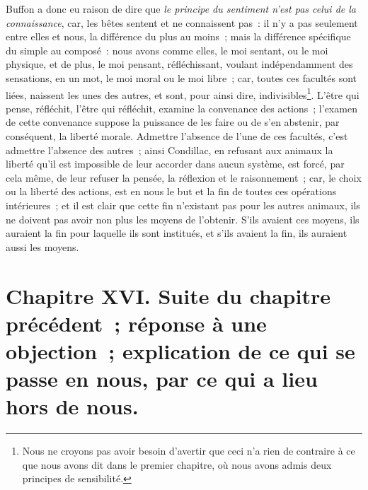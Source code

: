 \documentclass[french,twoside]{book} %
\newcommand\chapteropen{} %
\newcommand\chapterclose{} %
\begin{document}
Buffon a donc eu raison de dire que {\itshape le principe du sentiment n’est pas celui de la connaissance}, car, les bêtes sentent et ne connaissent pas : il n’y a pas seulement entre elles et nous, la différence du plus au moins ; mais la différence spécifique du simple au composé : nous avons comme elles, le moi sentant, ou le moi physique, et de plus, le moi pensant, réfléchissant, voulant indépendamment des sensations, en un mot, le moi moral ou le moi libre ; car, toutes ces facultés sont liées, naissent les unes des autres, et sont, pour ainsi dire, indivisibles\footnote{Nous ne croyons pas avoir besoin d’avertir que ceci n’a rien de contraire à ce que nous avons dit dans le premier chapitre, où nous avons admis deux principes de sensibilité.}. L’être qui pense, réfléchit, l’être qui réfléchit, examine la convenance des actions ; l’examen de cette convenance suppose la puissance de les faire ou de s’en abstenir, par conséquent, la liberté morale. Admettre l’absence de l’une de ces facultés, c’est admettre l’absence des autres ; ainsi Condillac, en refusant aux animaux la liberté qu’il est impossible de leur accorder dans aucun système, est forcé, par cela même, de leur refuser la pensée, la réflexion et le raisonnement ; car, le choix ou la liberté des actions, est en nous le but et la fin de toutes ces opérations intérieures ; et il est clair que cette fin n’existant pas pour les autres animaux, ils ne doivent pas avoir non plus les moyens de l’obtenir. S’ils avaient ces moyens, ils auraient la fin pour laquelle ils sont institués, et s’ils avaient la fin, ils auraient aussi les moyens.
\chapterclose


\chapteropen
\chapter[{Chapitre XVI. Suite du chapitre précédent ; réponse à une objection ; explication de ce qui se passe en nous, par ce qui a lieu hors de nous.}]{Chapitre XVI. Suite du chapitre précédent ; réponse à une objection ; explication de ce qui se passe en nous, par ce qui a lieu hors de nous.}\renewcommand{\leftmark}{Chapitre XVI. Suite du chapitre précédent ; réponse à une objection ; explication de ce qui se passe en nous, par ce qui a lieu hors de nous.}
\end{document}
